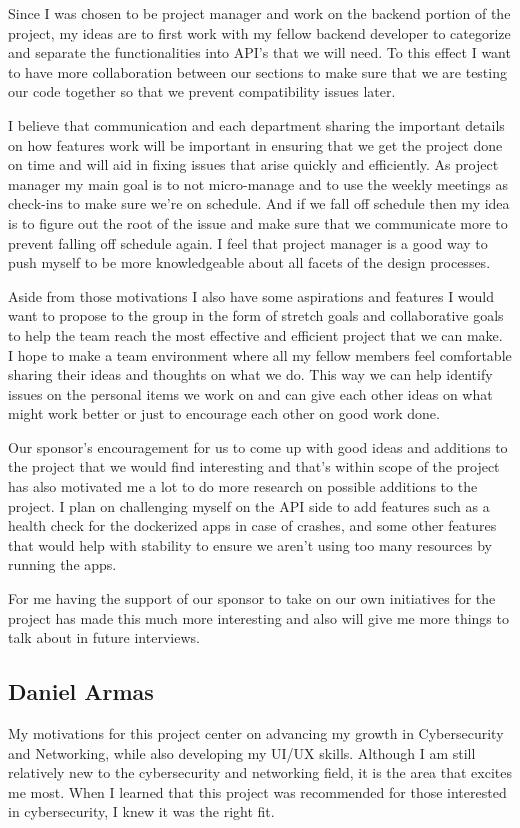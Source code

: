 \documentclass[12pt,titlepage]{article}
\begin{document}
Since I was chosen to be project manager and work on the backend portion of the project, my ideas are to first work with my fellow backend developer to categorize and separate the functionalities into API’s that we will need. To this effect I want to have more collaboration between our sections to make sure that we are testing our code together so that we prevent compatibility issues later.

I believe that communication and each department sharing the important details on how features work will be important in ensuring that we get the project done on time and will aid in fixing issues that arise quickly and efficiently. As project manager my main goal is to not micro-manage and to use the weekly meetings as check-ins to make sure we’re on schedule. And if we fall off schedule then my idea is to figure out the root of the issue and make sure that we communicate more to prevent falling off schedule again. I feel that project manager is a good way to push myself to be more knowledgeable about all facets of the design processes. 

Aside from those motivations I also have some aspirations and features I would want to propose to the group in the form of stretch goals and collaborative goals to help the team reach the most effective and efficient project that we can make. I hope to make a team environment where all my fellow members feel comfortable sharing their ideas and thoughts on what we do. This way we can help identify issues on the personal items we work on and can give each other ideas on what might work better or just to encourage each other on good work done.

Our sponsor's encouragement for us to come up with good ideas and additions to the project that we would find interesting and that's within scope of the project has also motivated me a lot to do more research on possible additions to the project. I plan on challenging myself on the API side to add features such as a health check for the dockerized apps in case of crashes, and some other features that would help with stability to ensure we aren't using too many resources by running the apps.

For me having the support of our sponsor to take on our own initiatives for the project has made this much more interesting and also will give me more things to talk about in future interviews. 

\subsection{Daniel Armas}
My motivations for this project center on advancing my growth in Cybersecurity and Networking, while also developing my UI/UX skills. Although I am still relatively new to the cybersecurity and networking field, it is the area that excites me most. When I learned that this project was recommended for those interested in cybersecurity, I knew it was the right fit.
\end{document}
